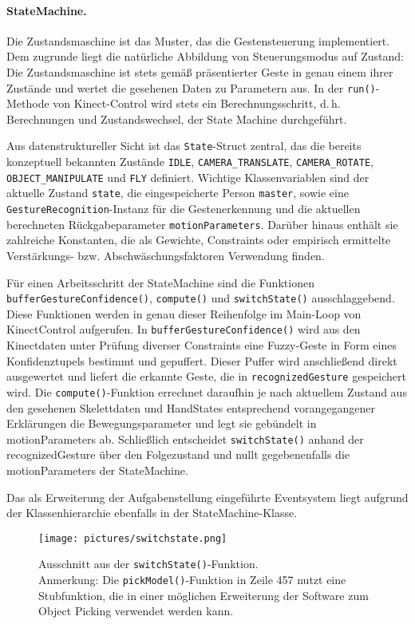 	\paragraph{StateMachine.}
	Die Zustandsmaschine ist das Muster, das die Gestensteuerung implementiert. Dem zugrunde liegt die natürliche Abbildung von Steuerungsmodus auf Zustand: Die Zustandsmaschine ist stets gemäß präsentierter Geste in genau einem ihrer Zustände und wertet die gesehenen Daten zu Parametern aus. In der \texttt{run()}-Methode von Kinect-Control wird stets ein Berechnungsschritt, d.\,h. Berechnungen und Zustandswechsel, der State Machine durchgeführt.\par 
	Aus datenstruktureller Sicht ist das \texttt{State}-Struct zentral, das die bereits konzeptuell bekannten Zustände \texttt{IDLE}, \texttt{CAMERA\_TRANSLATE}, \texttt{CAMERA\_ROTATE}, \texttt{OBJECT\_MANIPULATE} und \texttt{FLY} definiert. Wichtige Klassenvariablen sind der aktuelle Zustand \glqq{}\texttt{state}\grqq{}, die eingespeicherte Person \glqq{}\texttt{master}\grqq{}, sowie eine \texttt{GestureRecognition}-Instanz für die Gestenerkennung und die aktuellen berechneten Rückgabeparameter \glqq{}\texttt{motionParameters}\grqq{}. Darüber hinaus enthält sie zahlreiche Konstanten, die als Gewichte, Constraints oder empirisch ermittelte Verstärkungs- bzw. Abschwäschungsfaktoren Verwendung finden.\par 
	Für einen Arbeitsschritt der StateMachine sind die Funktionen \texttt{bufferGestureConfidence()}, \texttt{compute()} und \texttt{switchState()} ausschlaggebend. Diese Funktionen werden in genau dieser Reihenfolge im Main-Loop von KinectControl aufgerufen. In \texttt{bufferGestureConfidence()} wird aus den Kinectdaten unter Prüfung diverser Constraints eine Fuzzy-Geste in Form eines Konfidenztupels bestimmt und gepuffert. Dieser Puffer wird anschließend direkt ausgewertet und liefert die erkannte Geste, die in \texttt{recognizedGesture} gespeichert wird. Die \texttt{compute()}-Funktion errechnet daraufhin je nach aktuellem Zustand aus den gesehenen Skelettdaten und HandStates entsprechend vorangegangener Erklärungen die Bewegungsparameter und legt sie gebündelt in motionParameters ab. Schließlich entscheidet \texttt{switchState()} anhand der recognizedGesture über den Folgezustand und nullt gegebenenfalls die motionParameters der StateMachine.\par 
	Das als Erweiterung der Aufgabenstellung eingeführte Eventsystem liegt aufgrund der Klassenhierarchie ebenfalls in der StateMachine-Klasse.
	\begin{figure}[!h]
	\centering
	\texttt{[image: pictures/switchstate.png]}
	\caption{Ausschnitt aus der \texttt{switchState()}-Funktion.\\Anmerkung: Die \texttt{pickModel()}-Funktion in Zeile 457 nutzt eine Stubfunktion, die in einer möglichen Erweiterung der Software zum Object Picking verwendet werden kann.}\label{fig:switchstate}
	\end{figure}